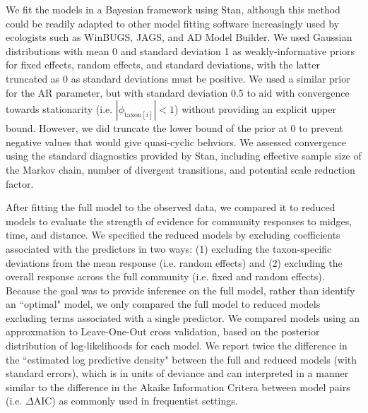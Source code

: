 We fit the models in a Bayesian framework using Stan, although this method could be
readily adapted to other model fitting software increasingly used by ecologists
such as WinBUGS, JAGS, and AD Model Builder.
We used Gaussian distributions with mean 0 and standard deviation 1 as
weakly-informative priors for fixed effects, random effects, and standard deviations,
with the latter truncated as 0 as standard deviations must be positive.
We used a similar prior for the AR parameter, but with standard deviation 0.5 to aid with
convergence towards stationarity (i.e. $|\phi_{\text{taxon}[i]}|<1$) without
providing an explicit upper bound.
However, we did truncate the lower bound of the prior at 0 to prevent negative
values that would give quasi-cyclic behviors.
We assessed convergence using the standard diagnostics provided by Stan,
including effective sample size of the Markov chain, number of divergent
transitions, and potential scale reduction factor.

After fitting the full model to the observed data, we compared it to reduced models
to evaluate the strength of evidence for community responses to midges, time,
and distance.
We specified the reduced models by excluding coefficients associated with the
predictors in two ways: (1) excluding the taxon-specific deviations from the mean
response (i.e. random effects) and (2) excluding the overall response across the
full community (i.e. fixed and random effects).
Because the goal was to provide inference on the full model, rather than identify
an ``optimal" model, we only compared the full model to reduced models
excluding terms associated with a single predictor.
We compared models using an approxmation to Leave-One-Out cross validation,
based on the posterior distribution of log-likelihoods for each model.
We report twice the difference in the ``estimated log predictive density" between
the full and reduced models (with standard errors), which is in units of
deviance and can interpreted in a manner similar to the difference in the
Akaike Information Critera between model pairs (i.e. $\Delta$AIC) as
commonly used in frequentist settings.

